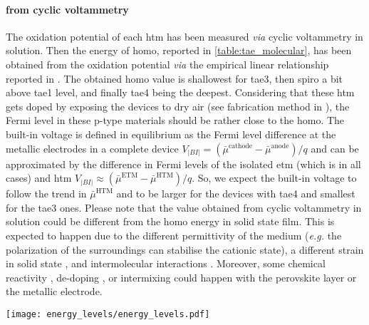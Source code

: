 	\paragraph{ from cyclic voltammetry}
	The oxidation potential of each \gls{htm} has been measured \textsl{via} cyclic voltammetry in solution.
	Then the energy of \gls{homo}, reported in \cref{table:tae_molecular}, has been obtained from the oxidation potential \textsl{via} the empirical linear relationship reported in .
	The obtained \gls{homo} value is shallowest for \gls{tae3}, then \gls{spiro} a bit above \gls{tae1} level, and finally \gls{tae4} being the deepest.
	Considering that these \gls{htm} gets doped by exposing the devices to dry air (see fabrication method in ), the Fermi level in these p-type materials should be rather close to the \gls{homo}.
	The built-in voltage is defined in equilibrium as the Fermi level difference at the metallic electrodes in a complete device $V_|BI| = (\bar\mu^{\mathrm{cathode}} - \bar\mu^{\mathrm{anode}})/q$ and can be approximated by the difference in Fermi levels of the isolated \gls{etm} (which is  in all cases) and \gls{htm} $V_|BI| \approx (\bar\mu^{\mathrm{ETM}} - \bar\mu^{\mathrm{HTM}})/q$.
	So, we expect the built-in voltage to follow the trend in $\bar\mu^{\mathrm{HTM}}$ and to be larger for the devices with \gls{tae4} and smallest for the \gls{tae3} ones.
	Please note that the value obtained from cyclic voltammetry in solution could be different from the \gls{homo} energy in solid state film.
	This is expected to happen due to the different permittivity of the medium (\textsl{e.g.} the polarization of the surroundings can stabilise the cationic state), a different strain in solid state \cite{Wei2012a}, and intermolecular interactions \cite{Kashimoto2018}.
	Moreover, some chemical reactivity \cite{Carrillo2016,Kim2016a}, de-doping \cite{Kim2017}, or intermixing \cite{Domanski2016} could happen with the perovskite layer or the metallic electrode.

	\begin{SCfigure}
		\centering
		\texttt{[image: energy\_levels/energy\_levels.pdf]}
		\label{fig:tae-energy_levels}
	\end{SCfigure}


